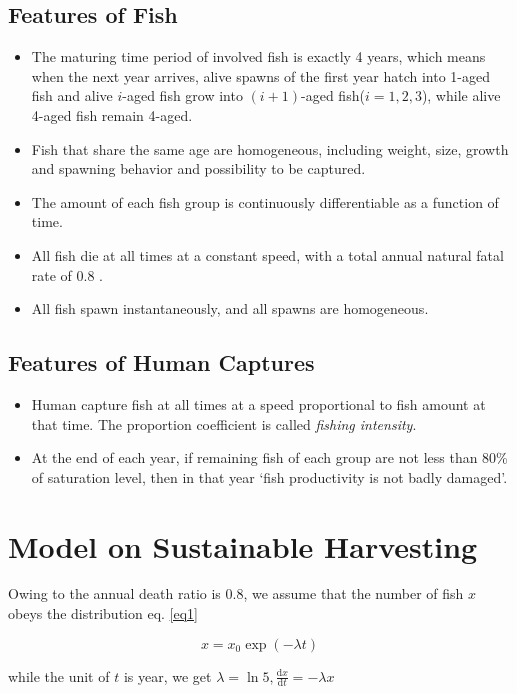 \documentclass{IEEEtran}
\begin{document}
\subsection{Features of Fish}
\begin{itemize}
\item {The maturing time period of involved fish is exactly 4 years, which means when the next year arrives, alive spawns of the first year hatch into 1-aged fish and alive $i$-aged fish grow into $(i+1)$-aged fish($i=1,2,3$), while alive 4-aged fish remain 4-aged.}
\item {Fish that share the same age are homogeneous, including weight, size, growth and spawning behavior and possibility to be captured.}
\item {The amount of each fish group is continuously differentiable as a function of time.}
\item {All fish die at all times at a constant speed, with a total annual natural fatal rate of 0.8 .}
\item {All fish spawn instantaneously, and all spawns are homogeneous. }
\end{itemize}

\subsection{Features of Human Captures}
\begin{itemize}
\item {Human capture fish at all times at a speed proportional to fish amount at that time. The proportion coefficient is called \textit{fishing intensity}.}
\item {At the end of each year, if remaining fish of each group are not less than 80\% of saturation level, then in that year `fish productivity is not badly damaged'.}
\end{itemize}
\section{Model on Sustainable Harvesting} \label{model1}
Owing to the annual death ratio is 0.8, we assume that the number of fish $x$ obeys the distribution eq. \ref{eq1}

\begin{equation}
    \label{eq1}
    x = x_0 \exp(-\lambda t)
\end{equation}

while the unit of $t$ is year, we get $\lambda = \ln 5, \frac{\mathrm dx}{\mathrm dt} = -\lambda x$
\end{document}
